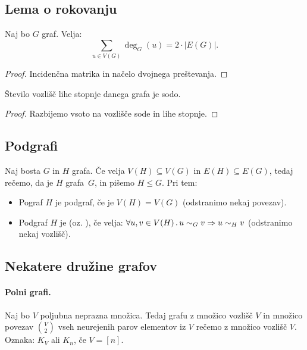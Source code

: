 \subsection{Lema o rokovanju}
\begin{lema}[o rokovanju]
    Naj bo $G$ graf. Velja: $$\sum_{u \in V(G)} \deg_G(u) = 2 \cdot |E(G)|.$$
\end{lema}

\begin{proof}
    Incidenčna matrika in načelo dvojnega preštevanja.
\end{proof}

\begin{posledica}
    Število vozlišč lihe stopnje danega grafa je sodo.
\end{posledica}

\begin{proof}
    Razbijemo vsoto na vozlišče sode in lihe stopnje.
\end{proof}

\subsection{Podgrafi}
\begin{definicija}
    Naj bosta $G$ in $H$ grafa. Če velja $V(H) \subseteq V(G)$ in $E(H) \subseteq E(G)$, tedaj rečemo, da je $H$  grafa~$G$, in pišemo $H \leq G$. Pri tem:
    \begin{itemize}
        \item Pograf $H$ je  podgraf, če je $V(H) = V(G)$ (odstranimo nekaj povezav).
        \item Podgraf $H$ je  (oz. ), če velja:  $\forall u, v \in V(H) \,.\, u \sim_G v \Rightarrow u \sim_H v$ (odstranimo nekaj vozlišč).
    \end{itemize}
\end{definicija}

\newpage
\subsection{Nekatere družine grafov}
\paragraph{Polni grafi.} Naj bo $V$ poljubna neprazna množica. Tedaj grafu z množico vozlišč $V$ in množico povezav $\binom{V}{2}$ vseh neurejenih parov elementov iz $V$ rečemo  z množico vozlišč $V$. Oznaka: $K_V$ ali $K_n$, če $V = [n]$.

